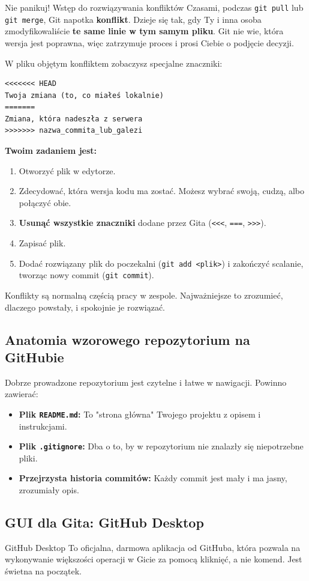 \begin{importantbox}{Nie panikuj! Wstęp do rozwiązywania konfliktów}
Czasami, podczas \texttt{git pull} lub \texttt{git merge}, Git napotka \textbf{konflikt}. Dzieje się tak, gdy Ty i inna osoba zmodyfikowaliście \textbf{te same linie w tym samym pliku}. Git nie wie, która wersja jest poprawna, więc zatrzymuje proces i prosi Ciebie o podjęcie decyzji.

W pliku objętym konfliktem zobaczysz specjalne znaczniki:
\begin{verbatim}
<<<<<<< HEAD
Twoja zmiana (to, co miałeś lokalnie)
=======
Zmiana, która nadeszła z serwera
>>>>>>> nazwa_commita_lub_galezi
\end{verbatim}
\textbf{Twoim zadaniem jest:}
\begin{enumerate}
    \item Otworzyć plik w edytorze.
    \item Zdecydować, która wersja kodu ma zostać. Możesz wybrać swoją, cudzą, albo połączyć obie.
    \item \textbf{Usunąć wszystkie znaczniki} dodane przez Gita (\texttt{<<<}, \texttt{===}, \texttt{>>>}).
    \item Zapisać plik.
    \item Dodać rozwiązany plik do poczekalni (\texttt{git add <plik>}) i zakończyć scalanie, tworząc nowy commit (\texttt{git commit}).
\end{enumerate}
Konflikty są normalną częścią pracy w zespole. Najważniejsze to zrozumieć, dlaczego powstały, i spokojnie je rozwiązać.
\end{importantbox}


\subsection{Anatomia wzorowego repozytorium na GitHubie}
Dobrze prowadzone repozytorium jest czytelne i łatwe w nawigacji. Powinno zawierać:
\begin{itemize}
    \item \textbf{Plik \texttt{README.md}:} To "strona główna" Twojego projektu z opisem i instrukcjami.
    \item \textbf{Plik \texttt{.gitignore}:} Dba o to, by w repozytorium nie znalazły się niepotrzebne pliki.
    \item \textbf{Przejrzysta historia commitów:} Każdy commit jest mały i ma jasny, zrozumiały opis.
\end{itemize}

\subsection{GUI dla Gita: GitHub Desktop}
\begin{definitionbox}{GitHub Desktop}
To oficjalna, darmowa aplikacja od GitHuba, która pozwala na wykonywanie większości operacji w Gicie za pomocą kliknięć, a nie komend. Jest świetna na początek.
\end{definitionbox}

